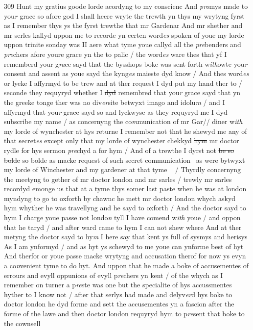 \documentclass[12pt, a4paper]{book}
\begin{document}
{\color{Mahogany}309} Hunt my gratius goode lorde acordyng to my conscienc And\textit{ pro}mys made to you\textit{r }grace so afore god I shall heere wryte the trewth yn thys my wrytyng fyrst as I remember thys ys the fyrst trewthe that mr Gardenar And mr shether and mr serles kallyd uppon me to recorde yn certen word\textit{es} spoken of youe 
			my lorde uppon trinite sonday was II aere what tyme youe callyd all the \textit{pre}benders and \textit{pre}chers afore youre grace yn the to 
			palic / the word\textit{es} ware thes that yf I rememberd your g\textit{ra}ce sayd that the bysshops boke was sent forth w\textit{ith}owte you\textit{r} consent and assent as youe sayd the kyng\textit{es} maieste dyd know / And thes word\textit{es} or lyeke I affyrmyd to be trew and at ther request I dyd put my hand ther to / seconde they requyryd whether I \sout{dyd }remembred that you\textit{r} grace sayd that yn the greeke tonge ther was no div\textit{er}site betwyxt imago and idolu\textit{m} / and I affyrmyd that you\textit{r} grace sayd so and lyckwyse as they requyryd me I dyd subscribe my name / as concernyng the co\textit{m}munication of mr Gar// diner w\textit{ith} my lorde of wynchester at hys returne I remember not that  he shewyd me any of that secret\textit{es} except only that my lorde of wynchester chekkyd \sout{hym }
               mr doctor rydle
			 for hys sermon \textit{pre}chyd a for hym / And of a trewthe I dyrst not \sout{be so bolde}
               so bolde as macke request of such secret communication  as were bytwyxt my lorde of Winchester and my gardener at that tyme
			  / Thyrdly concernyng the meetyng to gether of mr doctor london  and mr sarles / trewly mr sarles recordyd emonge us that at a tyme thys somer last paste when he was at london myndyng to go to oxforth by chawnc he mett mr doctor london whych askyd hym whyther he was travellyng and he sayd to oxforth / And the doctor sayd to hym I charge youe passe not londo\textit{n} tyll I have comend w\textit{ith} youe / and oppon that he taryd / and after ward came  to hym I can not shew where And at ther metyng the doctor sayd to hy\textit{m} I here say that kent ys full of sysmys and herisys As I am ynformyd / and as hyt ys 
			schewyd to me youe can ynforme best of hyt And therfor or youe passe macke wrytyng and accusation therof for now ys evyn a co\textit{n}venient  tyme to do hyt. And uppon that he made a boke of accusementes of errours and evyll oppunions of evyll p\textit{re}chers yn kent / of the whych as I remember on 
			turner a p\textit{re}ste was one but the specialite of hys accussmentes hyther to I know not / after that serlys had made and delyv\textit{er}d hys boke to doctor london he dyd forme and sett the accusementes yn a fascion after the forme of the lawe and then doctor london requyryd hym to p\textit{re}sent that boke to the cownsell
\end{document}
